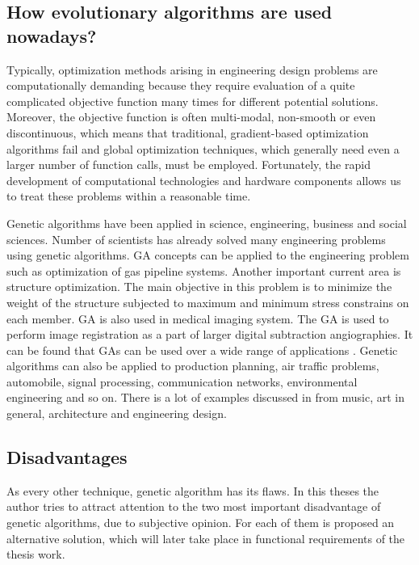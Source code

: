 \subsection{How evolutionary algorithms are used nowadays?}

Typically, optimization methods arising in engineering design problems are computationally demanding because they require evaluation of a quite complicated objective function many times for different potential solutions. Moreover, the objective function is often multi-modal, non-smooth or even discontinuous, which means that traditional, gradient-based optimization algorithms fail and global optimization techniques, which generally need even a larger number of function calls, must be employed. Fortunately, the rapid development of computational technologies and hardware components allows us to treat these problems within a reasonable time.

Genetic algorithms have been applied in science, engineering, business and social sciences. Number of scientists has already solved many engineering problems using genetic algorithms. GA concepts can be applied to the engineering problem such as optimization of gas pipeline systems. Another important current area is structure optimization. The main objective in this problem is to minimize the weight of the structure subjected to maximum and minimum stress constrains on each member. GA is also used in medical imaging system. The GA is used to perform image registration as a part of larger digital subtraction angiographies. It can be found that GAs can be used over a wide range of applications \cite{introduction_to_ga}. Genetic algorithms can also be applied to production planning, air traffic problems, automobile, signal processing, communication networks, environmental engineering and so on. There is a lot of examples discussed in \cite{creative_ga} from music, art in general, architecture and engineering design.

\subsection{Disadvantages}
As every other technique, genetic algorithm has its flaws. In this theses the author tries to attract attention to the two most important disadvantage of genetic algorithms, due to subjective opinion. For each of them is proposed an alternative solution, which will later take place in functional requirements of the thesis work.

